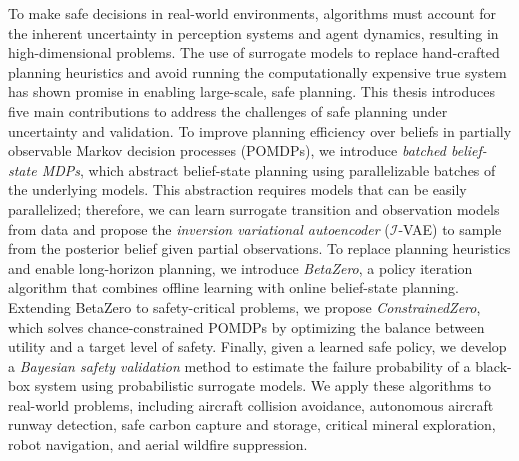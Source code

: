 To make safe decisions in real-world environments, algorithms must account for the inherent uncertainty in perception systems and agent dynamics, resulting in high-dimensional problems.
The use of surrogate models to replace hand-crafted planning heuristics and avoid running the computationally expensive true system has shown promise in enabling large-scale, safe planning.
This thesis introduces five main contributions to address the challenges of safe planning under uncertainty and validation.
To improve planning efficiency over beliefs in partially observable Markov decision processes (POMDPs), we introduce \textit{batched belief-state MDPs}, which abstract belief-state planning using parallelizable batches of the underlying models.
This abstraction requires models that can be easily parallelized; therefore, we can learn surrogate transition and observation models from data and propose the \textit{inversion variational autoencoder} ($\mathcal{I}$-VAE) to sample from the posterior belief given partial observations.
To replace planning heuristics and enable long-horizon planning, we introduce \textit{BetaZero}, a policy iteration algorithm that combines offline learning with online belief-state planning.
Extending BetaZero to safety-critical problems, we propose \textit{ConstrainedZero}, which solves chance-constrained POMDPs by optimizing the balance between utility and a target level of safety.
Finally, given a learned safe policy, we develop a \textit{Bayesian safety validation} method to estimate the failure probability of a black-box system using probabilistic surrogate models.
We apply these algorithms to real-world problems, including aircraft collision avoidance, autonomous aircraft runway detection, safe carbon capture and storage, critical mineral exploration, robot navigation, and aerial wildfire suppression.
